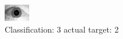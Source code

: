 \begin{figure}[h!]
\begin{center}
\includegraphics[width=0.60\columnwidth]{figures/ID1661_class_3_target_2.png}
\end{center}
\caption{ Classification: 3 actual target: 2}
\label{fig:ID1661_class_3_target_2}
\end{figure}
